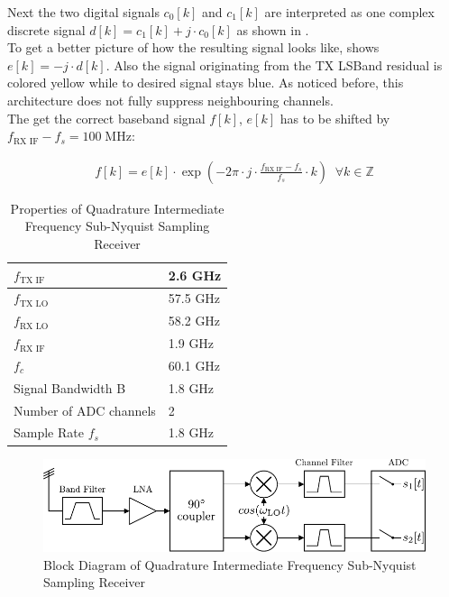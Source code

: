 Next the two digital signals $c_0[k]$ and $c_1[k]$ are interpreted as one
complex discrete signal $d[k] = c_1[k] + j \cdot c_0[k]$ as shown in
. \\

To get a better picture of how the resulting signal looks like,
 shows $e[k] = -j \cdot d[k]$. Also the signal
originating from the \gls{TX} \gls{LSBand} residual is colored yellow
while to desired signal stays blue.
As noticed before, this architecture does not fully suppress neighbouring
channels. \\

The get the correct baseband signal $f[k]$, $e[k]$ has to be shifted by
$f_{\text{RX IF}} - f_s = 100 \; \text{MHz}$:

\begin{align}
  f[k] = e[k] \cdot \exp\left(-2\pi \cdot j \cdot
  \frac{f_{\text{RX IF}} - f_s}{f_s} \cdot k \right)
  \;\; \forall k \in \mathbb{Z}
\end{align}

\begin{table}[h]
  \centering
  \begin{tabular}{|l|l|}
    \hline
    $f_{\text{TX IF}}$ & 2.6 GHz \\ \hline
    $f_{\text{TX LO}}$ & 57.5 GHz \\ \hline
    $f_{\text{RX LO}}$ & 58.2 GHz \\ \hline
    $f_{\text{RX IF}}$ & 1.9 GHz \\ \hline
    $f_c$            & 60.1 GHz \\ \hline
    Signal Bandwidth B & 1.8 GHz \\ \hline
    Number of \gls{ADC} channels & 2 \\ \hline
    Sample Rate $f_s$ & 1.8 GHz \\ \hline
  \end{tabular}
  \caption{Properties of Quadrature Intermediate Frequency
    Sub-Nyquist Sampling Receiver}
  \label{tab:rx_2}
\end{table}

\begin{figure}[h!]
  \centering
  \includegraphics[width=\textwidth]{figures/quad_if_rx_block_diagram}
  \caption{Block Diagram of Quadrature Intermediate Frequency Sub-Nyquist Sampling Receiver}
  \label{fig:rx_2_bd}
\end{figure}

